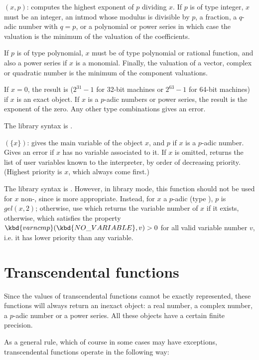$(x,p)$: \label{se:valuation}
computes the highest
exponent of $p$ dividing $x$. If $p$ is of type integer, $x$ must be an
integer, an intmod whose modulus is divisible by $p$, a fraction, a
$q$-adic number with $q=p$, or a polynomial or power series in which case the
valuation is the minimum of the valuation of the coefficients.

If $p$ is of type polynomial, $x$ must be of type polynomial or rational
function, and also a power series if $x$ is a monomial. Finally, the
valuation of a vector, complex or quadratic number is the minimum of the
component valuations.

If $x=0$, the result is  ($2^{31}-1$ for 32-bit machines or
$2^{63}-1$ for 64-bit machines) if $x$ is an exact object. If $x$ is a
$p$-adic numbers or power series, the result is the exponent of the zero.
Any other type combinations gives an error.

The library syntax is .

$(\{x\})$: \label{se:variable}
gives the main variable of the object $x$, and
$p$ if $x$ is a $p$-adic number. Gives an error if $x$ has no variable
associated to it. If $x$ is omitted, returns the list of user variables known
to the interpreter, by order of decreasing priority. (Highest priority is $x$,
which always come first.)

The library syntax is .
However, in library mode, this function should not be used for $x$
non-, since  is more appropriate. Instead, for
$x$ a $p$-adic (type ), $p$ is $gel(x,2)$; otherwise, use
 which returns the variable number of $x$ if
it exists,  otherwise, which satisfies the property
$\kbd{varncmp}(\kbd{NO\_VARIABLE}, v) > 0$ for all valid variable number
$v$, i.e. it has lower priority than any variable.

\section{Transcendental functions}\label{se:trans}

Since the values of transcendental functions cannot be exactly represented,
these functions will always return an inexact object: a real number,
a complex number, a $p$-adic number or a power series.  All these objects
have a certain finite precision.

As a general rule, which of course in some cases may have exceptions,
transcendental functions operate in the following way:


